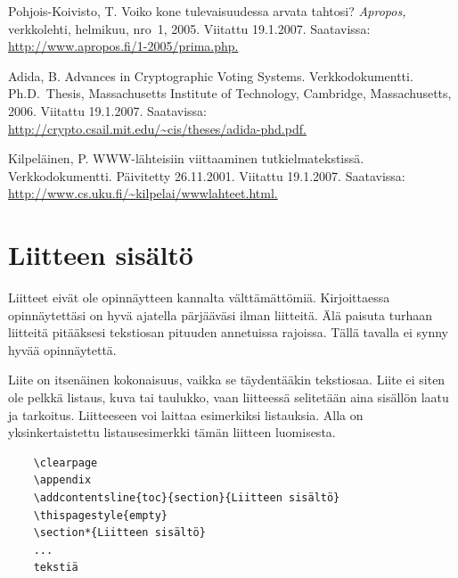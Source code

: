 \documentclass[finnish, 12pt, a4paper, elec, utf8, a-2b, online]{aaltothesis}
\begin{document}
\begin{thebibliography}{99}
 Pohjois-Koivisto, T. Voiko kone tulevaisuudessa arvata tahtosi? 
   \textit{Apropos,} verkkolehti, helmikuu, nro~1, 2005. Viitattu 19.1.2007. 
Saatavissa: \url{http://www.apropos.fi/1-2005/prima.php.}

 Adida, B. \foreignlanguage{english}{Advances in Cryptographic 
	Voting Systems.} Verkkodokumentti. 
	\foreignlanguage{english}{Ph.D.\ Thesis, Massachusetts Institute of	
		Technology, Cambridge, Massachusetts,} 2006. Viitattu 19.1.2007. 
	Saatavissa:
	\url{http://crypto.csail.mit.edu/~cis/theses/adida-phd.pdf.}

 Kilpeläinen, P. WWW-lähteisiin viittaaminen 
   tutkielmatekstissä. Verkkodokumentti. Päivitetty 26.11.2001.
   Viitattu 19.1.2007. Saatavissa:
   \url{http://www.cs.uku.fi/~kilpelai/wwwlahteet.html.}

\end{thebibliography}


\clearpage
\thesisappendix

\section{Liitteen sisältö}
\label{liite:sisalto}

Liitteet eivät ole opinnäytteen kannalta välttämättömiä. Kirjoittaessa 
opinnäytettäsi on hyvä ajatella pärjääväsi ilman liitteitä. Älä paisuta turhaan 
liitteitä pitääksesi tekstiosan pituuden annetuissa rajoissa. Tällä tavalla ei 
synny hyvää opinnäytettä.   

Liite on itsenäinen kokonaisuus, vaikka se täydentääkin tekstiosaa. Liite ei 
siten ole pelkkä listaus, kuva tai taulukko, vaan liitteessä selitetään aina 
sisällön laatu ja tarkoitus. Liitteeseen voi laittaa esimerkiksi listauksia. 
Alla on yksinkertaistettu listausesimerkki tämän liitteen luomisesta. 
\begin{verbatim}
	\clearpage
	\appendix
	\addcontentsline{toc}{section}{Liitteen sisältö}
	\thispagestyle{empty}
	\section*{Liitteen sisältö}
	...
	tekstiä
\end{verbatim}
\end{document}
